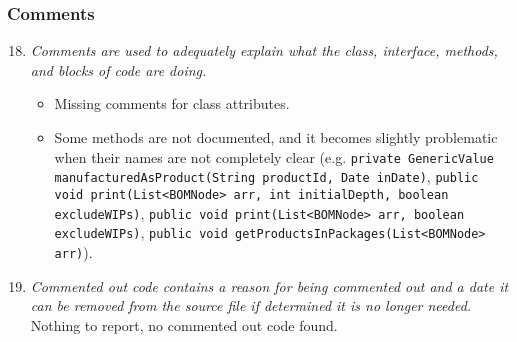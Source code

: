 	\subsubsection{Comments}
		\begin{enumerate}
			\setcounter{enumi}{17}
			\item \textit{Comments are used to adequately explain what the class, interface, methods, and blocks of code are doing.}
			\begin{itemize}
				\item Missing comments for class attributes.
				\item Some methods are not documented, and it becomes slightly problematic when their names are not completely clear (e.g.\newline
				\texttt{private GenericValue manufacturedAsProduct(String productId, Date inDate)},\newline
				\texttt{public void print(List<BOMNode> arr, int initialDepth, boolean excludeWIPs)},\newline
				\texttt{public void print(List<BOMNode> arr, boolean excludeWIPs)},\newline
				\texttt{public void getProductsInPackages(List<BOMNode> arr)}).
			\end{itemize}

			\item \textit{Commented out code contains a reason for being commented out and a date it can be removed from the source file if determined it is no longer needed.}\newline
			Nothing to report, no commented out code found. %
		\end{enumerate}

